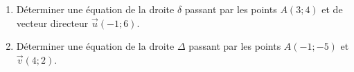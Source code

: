 
\begin{enumerate}
\item Déterminer une équation de la droite $\delta$ passant par les points $A(3;4)$ et de vecteur directeur $\overrightarrow{u}(-1;6)$. 
\item Déterminer une équation de la droite $\Delta$ passant par les points $A(-1;-5)$ et $\overrightarrow{v}(4;2)$.
\end{enumerate}